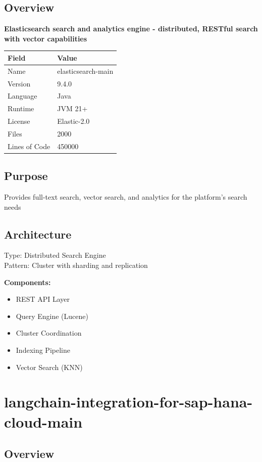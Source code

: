 \documentclass[11pt,a4paper]{article}
\begin{document}
\subsection{Overview}

\textbf{Elasticsearch search and analytics engine - distributed, RESTful search with vector capabilities}

\begin{tabular}{@{}ll@{}}
\toprule
\textbf{Field} & \textbf{Value} \\
\midrule
Name & elasticsearch-main \\
Version & 9.4.0 \\
Language & Java \\
Runtime & JVM 21+ \\
License & Elastic-2.0 \\
Files & 2000 \\
Lines of Code & 450000 \\
\bottomrule
\end{tabular}

\subsection{Purpose}
Provides full-text search, vector search, and analytics for the platform's search needs

\subsection{Architecture}
Type: Distributed Search Engine \\
Pattern: Cluster with sharding and replication

\textbf{Components:}\begin{itemize}[noitemsep]
\item REST API Layer
\item Query Engine (Lucene)
\item Cluster Coordination
\item Indexing Pipeline
\item Vector Search (KNN)
\end{itemize}

\newpage


\section{langchain-integration-for-sap-hana-cloud-main}

\subsection{Overview}
\end{document}
